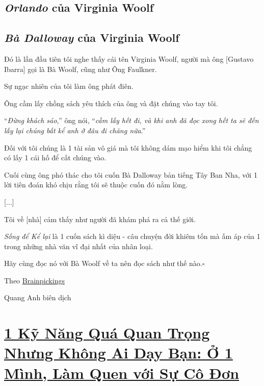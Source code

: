 \documentclass{book}
\numberwithin{equation}{section}
\begin{document}
\section{\textit{Orlando} của Virginia Woolf}

\section{\textit{Bà Dalloway} của Virginia Woolf}
Đó là lần đầu tiên tôi nghe thấy cái tên Virginia Woolf, người mà ông [Gustavo Ibarra] gọi là Bà Woolf, cũng như Ông Faulkner.

Sự ngạc nhiên của tôi làm ông phát điên.

Ông cầm lấy chồng sách yêu thích của ông và đặt chúng vào tay tôi.

%
``\textit{Đừng khách sáo},'' ông nói, ``\textit{cầm lấy hết đi, và khi anh đã đọc xong hết ta sẽ đến lấy lại chúng bất kể anh ở đâu đi chăng nữa}.''

%
Đối với tôi chúng là 1 tài sản vô giá mà tôi không dám mạo hiểm khi tôi chẳng có lấy 1 cái hố để cất chúng vào.

Cuối cùng ông phó thác cho tôi cuốn Bà Dalloway bản tiếng Tây Ban Nha, với 1 lời tiên đoán khó chịu rằng tôi sẽ thuộc cuốn đó nằm lòng.

[$\ldots$]

%
Tôi về [nhà] cảm thấy như người đã khám phá ra cả thế giới.

%
\textit{Sống để Kể lại} là 1 cuốn sách kì diệu - câu chuyện đời khiêm tốn mà ấm áp của 1 trong những nhà văn vĩ đại nhất của nhân loại.

Hãy cùng đọc nó với Bà Woolf về ta nên đọc sách như thế nào.\hfill$\square$

\begin{flushright}
    Theo \href{https://www.brainpickings.org/2015/04/06/marquez-favorite-books/?fbclid=IwAR0JImPeIOfnzQxVa-czES1VWLGVG-kyYEdAQm6O2yl0DAJvyrA6V-kO08s}{Brainpickings}
    
    Quang Anh biên dịch
\end{flushright}


\chapter{\href{http://tramdoc.vn/tin-tuc/mot-ki-nang-qua-quan-trong-nhung-khong-ai-day-ban-o-mot-minh-lam-quen-voi-su-co-don-nyV68W.html}{1 Kỹ Năng Quá Quan Trọng Nhưng Không Ai Dạy Bạn: Ở 1 Mình, Làm Quen với Sự Cô Đơn}}
\end{document}

